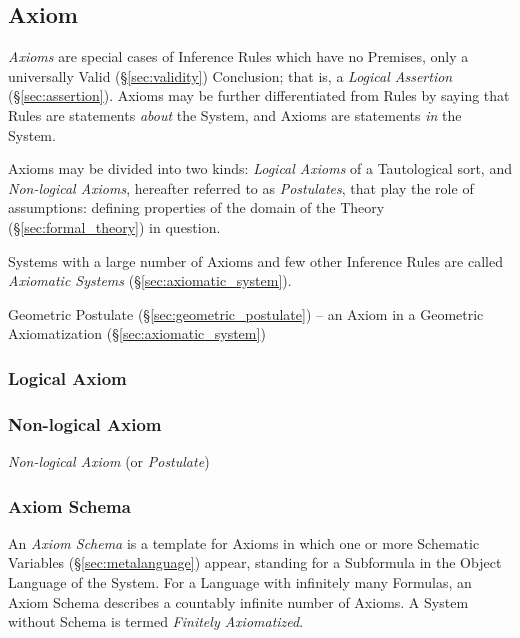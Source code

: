 \subsection{Axiom}\label{sec:axiom}

\emph{Axioms} are special cases of Inference Rules which have no
Premises, only a universally Valid (\S\ref{sec:validity}) Conclusion;
that is, a \emph{Logical Assertion} (\S\ref{sec:assertion}). Axioms
may be further differentiated from Rules by saying that Rules are
statements \emph{about} the System, and Axioms are statements
\emph{in} the System.

Axioms may be divided into two kinds: \emph{Logical Axioms} of a
Tautological sort, and \emph{Non-logical Axioms}, hereafter referred
to as \emph{Postulates}, that play the role of assumptions: defining
properties of the domain of the Theory (\S\ref{sec:formal_theory}) in
question.

Systems with a large number of Axioms and few other Inference Rules
are called \emph{Axiomatic Systems} (\S\ref{sec:axiomatic_system}).

\fist Geometric Postulate (\S\ref{sec:geometric_postulate}) -- an Axiom in a
Geometric Axiomatization (\S\ref{sec:axiomatic_system})



\subsubsection{Logical Axiom}\label{sec:logical_axiom}

\subsubsection{Non-logical Axiom}\label{sec:nonlogical_axiom}

\emph{Non-logical Axiom} (or \emph{Postulate})



\subsubsection{Axiom Schema}\label{sec:axiom_schema}

An \emph{Axiom Schema} is a template for Axioms in which one or more
Schematic Variables (\S\ref{sec:metalanguage}) appear, standing for a
Subformula in the Object Language of the System. For a Language with
infinitely many Formulas, an Axiom Schema describes a countably infinite
number of Axioms. A System without Schema is termed \emph{Finitely
  Axiomatized}.



